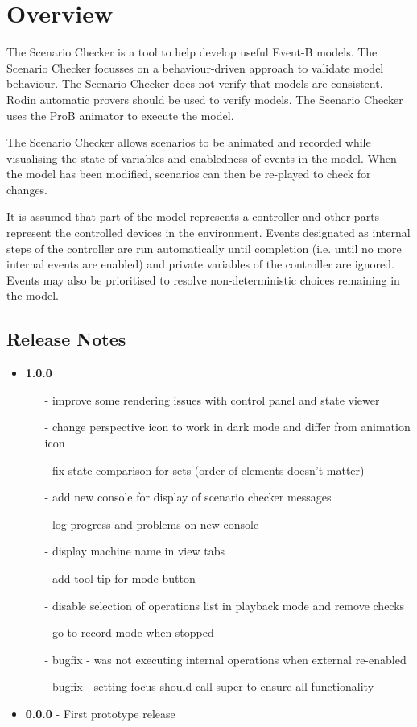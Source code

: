 \section{Overview}
\label{sec:overview}

The Scenario Checker is a tool to help develop useful Event-B models.
The Scenario Checker focusses on a behaviour-driven approach to validate model behaviour.
The Scenario Checker does not verify that models are consistent.
 Rodin automatic provers should be used to verify models.
The Scenario Checker uses the ProB animator to execute the model.

The Scenario Checker allows scenarios to be animated and recorded while visualising the state of variables and enabledness of events in the model.
When the model has been modified, scenarios can then be re-played to check for changes.

It is assumed that part of the model represents a controller and other parts represent the controlled devices in the environment.
Events designated as internal steps of the controller are run automatically until completion (i.e. until no more internal events are enabled) and private variables of the controller are ignored.
Events may also be prioritised to resolve non-deterministic choices remaining in the model.

\subsection{Release Notes}
\label{sec:release-notes}

\begin{itemize}
	\item \textbf{1.0.0}
	\begin{itemize}	
		\item[-]	improve some rendering issues with control panel and state viewer
		\item[-]	change perspective icon to work in dark mode and differ from animation icon
		\item[-]	fix state comparison for sets (order of elements doesn't matter)
		\item[-]	add new console for display of scenario checker messages
		\item[-]	log progress and problems on new console
		\item[-]	display machine name in view tabs
		\item[-]	add tool tip for mode button
		\item[-]	disable selection of operations list in playback mode and remove checks
		\item[-]	go to record mode when stopped
		\item[-]	bugfix - was not executing internal operations when external re-enabled
		\item[-]	bugfix - setting focus should call super to ensure all functionality
	\end{itemize}
	\item \textbf{0.0.0} - First prototype release
\end{itemize}

